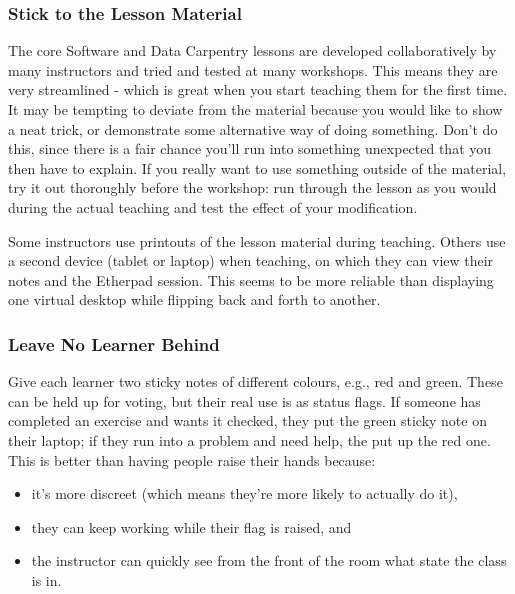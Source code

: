 \subsubsection{Stick to the Lesson
Material}\label{stick-to-the-lesson-material}

The core Software and Data Carpentry lessons are developed
collaboratively by many instructors and tried and tested at many
workshops. This means they are very streamlined - which is great when
you start teaching them for the first time. It may be tempting to
deviate from the material because you would like to show a neat trick,
or demonstrate some alternative way of doing something. Don't do this,
since there is a fair chance you'll run into something unexpected that
you then have to explain. If you really want to use something outside of
the material, try it out thoroughly before the workshop: run through the
lesson as you would during the actual teaching and test the effect of
your modification.

Some instructors use printouts of the lesson material during teaching.
Others use a second device (tablet or laptop) when teaching, on which
they can view their notes and the Etherpad session. This seems to be
more reliable than displaying one virtual desktop while flipping back
and forth to another.

\subsubsection{Leave No Learner Behind}\label{leave-no-learner-behind}

Give each learner two sticky notes of different colours, e.g., red and
green. These can be held up for voting, but their real use is as status
flags. If someone has completed an exercise and wants it checked, they
put the green sticky note on their laptop; if they run into a problem
and need help, the put up the red one. This is better than having people
raise their hands because:

\begin{itemize}
\itemsep1pt\parskip0pt
\item
  it's more discreet (which means they're more likely to actually do
  it),
\item
  they can keep working while their flag is raised, and
\item
  the instructor can quickly see from the front of the room what state
  the class is in.
\end{itemize}

